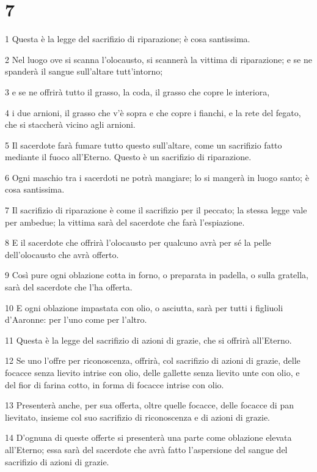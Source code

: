 \chapter{7}

\par 1 Questa è la legge del sacrifizio di riparazione; è cosa santissima.
\par 2 Nel luogo ove si scanna l'olocausto, si scannerà la vittima di riparazione; e se ne spanderà il sangue sull'altare tutt'intorno;
\par 3 e se ne offrirà tutto il grasso, la coda, il grasso che copre le interiora,
\par 4 i due arnioni, il grasso che v'è sopra e che copre i fianchi, e la rete del fegato, che si staccherà vicino agli arnioni.
\par 5 Il sacerdote farà fumare tutto questo sull'altare, come un sacrifizio fatto mediante il fuoco all'Eterno. Questo è un sacrifizio di riparazione.
\par 6 Ogni maschio tra i sacerdoti ne potrà mangiare; lo si mangerà in luogo santo; è cosa santissima.
\par 7 Il sacrifizio di riparazione è come il sacrifizio per il peccato; la stessa legge vale per ambedue; la vittima sarà del sacerdote che farà l'espiazione.
\par 8 E il sacerdote che offrirà l'olocausto per qualcuno avrà per sé la pelle dell'olocausto che avrà offerto.
\par 9 Così pure ogni oblazione cotta in forno, o preparata in padella, o sulla gratella, sarà del sacerdote che l'ha offerta.
\par 10 E ogni oblazione impastata con olio, o asciutta, sarà per tutti i figliuoli d'Aaronne: per l'uno come per l'altro.
\par 11 Questa è la legge del sacrifizio di azioni di grazie, che si offrirà all'Eterno.
\par 12 Se uno l'offre per riconoscenza, offrirà, col sacrifizio di azioni di grazie, delle focacce senza lievito intrise con olio, delle gallette senza lievito unte con olio, e del fior di farina cotto, in forma di focacce intrise con olio.
\par 13 Presenterà anche, per sua offerta, oltre quelle focacce, delle focacce di pan lievitato, insieme col suo sacrifizio di riconoscenza e di azioni di grazie.
\par 14 D'ognuna di queste offerte si presenterà una parte come oblazione elevata all'Eterno; essa sarà del sacerdote che avrà fatto l'aspersione del sangue del sacrifizio di azioni di grazie.
